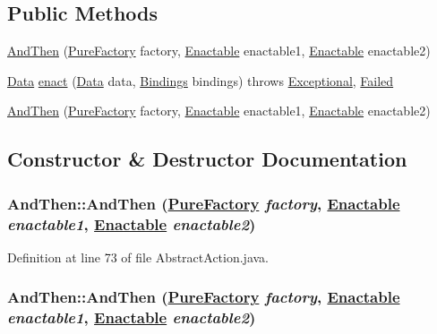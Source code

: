 \subsection*{Public Methods}
\begin{CompactItemize}
\item 
\hyperlink{classAndThen_a0}{And\-Then} (\hyperlink{classPureFactory}{Pure\-Factory} factory, \hyperlink{interfaceEnactable}{Enactable} enactable1, \hyperlink{interfaceEnactable}{Enactable} enactable2)
\item 
\hyperlink{interfaceData}{Data} \hyperlink{classAndThen_a1}{enact} (\hyperlink{interfaceData}{Data} data, \hyperlink{interfaceBindings}{Bindings} bindings) throws \hyperlink{classExceptional}{Exceptional}, \hyperlink{classFailed}{Failed}
\item 
\hyperlink{classAndThen_a2}{And\-Then} (\hyperlink{classPureFactory}{Pure\-Factory} factory, \hyperlink{interfaceEnactable}{Enactable} enactable1, \hyperlink{interfaceEnactable}{Enactable} enactable2)
\end{CompactItemize}


\subsection{Constructor \& Destructor Documentation}
\hypertarget{classAndThen_a0}{
\subsubsection[AndThen]{\setlength{\rightskip}{0pt plus 5cm}And\-Then::And\-Then (\hyperlink{classPureFactory}{Pure\-Factory} {\em factory}, \hyperlink{interfaceEnactable}{Enactable} {\em enactable1}, \hyperlink{interfaceEnactable}{Enactable} {\em enactable2})}}
\label{classAndThen_a0}




Definition at line 73 of file Abstract\-Action.java.\hypertarget{classAndThen_a2}{
\subsubsection[AndThen]{\setlength{\rightskip}{0pt plus 5cm}And\-Then::And\-Then (\hyperlink{classPureFactory}{Pure\-Factory} {\em factory}, \hyperlink{interfaceEnactable}{Enactable} {\em enactable1}, \hyperlink{interfaceEnactable}{Enactable} {\em enactable2})}}
\label{classAndThen_a2}




